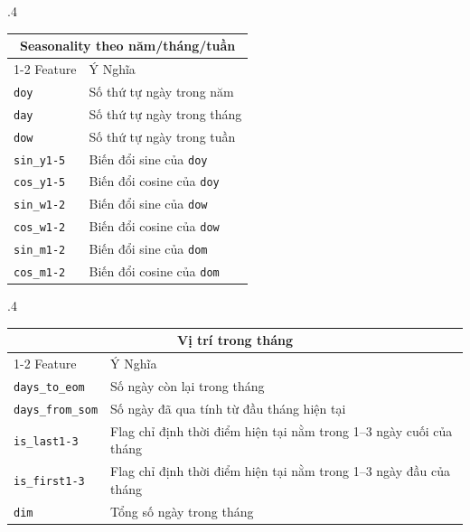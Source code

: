 \documentclass{article}
\begin{document}
\begin{appendices}
\begin{table}[h]
    \centering
    \begin{subtable}{.4\textwidth}
        \begin{tabular}{l>{\raggedright\arraybackslash}p{4cm}}
            \toprule
            \multicolumn{2}{c}{Seasonality theo năm/tháng/tuần} \\
            \cmidrule(r){1-2}
            Feature & Ý Nghĩa \\
            \midrule
            \texttt{doy} & Số thứ tự ngày trong năm\\
            \texttt{day} & Số thứ tự ngày trong tháng\\
            \texttt{dow} & Số thứ tự ngày trong tuần\\
            \texttt{sin\_y1-5} & Biến đổi sine của \texttt{doy}\\
            \texttt{cos\_y1-5} & Biến đổi cosine của \texttt{doy}\\
            \texttt{sin\_w1-2} & Biến đổi sine của \texttt{dow}\\ 
            \texttt{cos\_w1-2} & Biến đổi cosine của \texttt{dow}\\
            \texttt{sin\_m1-2} & Biến đổi sine của \texttt{dom}\\ 
            \texttt{cos\_m1-2} & Biến đổi cosine của \texttt{dom}\\
            \bottomrule
        \end{tabular}
    \end{subtable}
    \hfill
    \begin{subtable}{.4\textwidth}
        \begin{tabular}{l>{\raggedright\arraybackslash}p{4cm}}
            \toprule
            \multicolumn{2}{c}{Vị trí trong tháng} \\
            \cmidrule(r){1-2}
            Feature & Ý Nghĩa \\
            \midrule
            \texttt{days\_to\_eom} & Số ngày còn lại trong tháng\\
            \texttt{days\_from\_som} & Số ngày đã qua tính từ đầu tháng hiện tại\\
            \texttt{is\_last1-3} & Flag chỉ định thời điểm hiện tại nằm trong 1--3 ngày cuối của tháng\\
            \texttt{is\_first1-3} & Flag chỉ định thời điểm hiện tại nằm trong 1--3 ngày đầu của tháng\\
            \texttt{dim} & Tổng số ngày trong tháng\\
            \bottomrule
        \end{tabular}
    \end{subtable}
\end{table}


\end{appendices}
\end{document}
